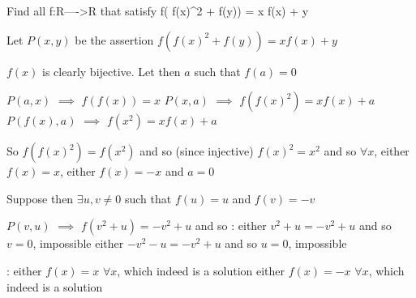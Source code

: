 \begin{solution}
	\begin{tcolorbox}Find all f:R---->R that satisfy  f( f(x)^2 + f(y)) = x f(x) + y\end{tcolorbox}
Let $P(x,y)$ be the assertion $f(f(x)^2+f(y))=xf(x)+y$

$f(x)$ is clearly bijective.
Let then $a$ such that $f(a)=0$ 

$P(a,x)$ $\implies$ $f(f(x))=x$
$P(x,a)$ $\implies$ $f(f(x)^2)=xf(x)+a$
$P(f(x),a)$ $\implies$ $f(x^2)=xf(x)+a$

So $f(f(x)^2)=f(x^2)$ and so (since injective) $f(x)^2=x^2$ and so $\forall x$, either $f(x)=x$, either $f(x)=-x$ and $a=0$

Suppose then $\exists u,v\ne 0$ such that $f(u)=u$ and $f(v)=-v$

$P(v,u)$ $\implies$ $f(v^2+u)=-v^2+u$ and so :
either $v^2+u=-v^2+u$ and so $v=0$, impossible
either $-v^2-u=-v^2+u$ and so $u=0$, impossible

 :
either $f(x)=x$ $\forall x$, which indeed is a solution
either $f(x)=-x$ $\forall x$, which indeed is a solution
\end{solution}



